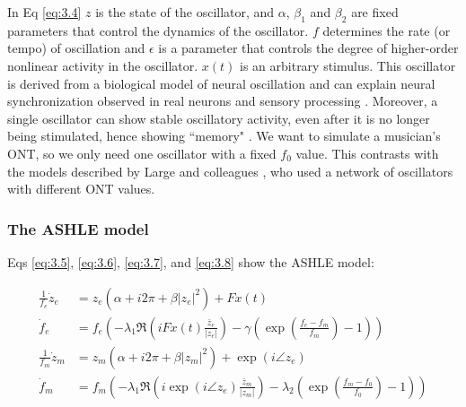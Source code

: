 \documentclass{report}
\begin{document}
In Eq \eqref{eq:3.4} $z$ is the state of the oscillator, and $\alpha$, $\beta_1$ and $\beta_2$ are fixed parameters that control the dynamics of the oscillator. $f$ determines the rate (or tempo) of oscillation and $\epsilon$ is a parameter that controls the degree of higher-order nonlinear activity in the oscillator. $x(t)$ is an arbitrary stimulus. This oscillator is derived from a biological model of neural oscillation and can explain neural synchronization observed in real neurons and sensory processing \cite{lerud2019canonical, tal2017neural}. Moreover, a single oscillator can show stable oscillatory activity, even after it is no longer being stimulated, hence showing ``memory" \cite{kim2015signal}. We want to simulate a musician's ONT, so we only need one oscillator with a fixed $f_0$ value. This contrasts with the models described by Large and colleagues \cite{large2010canonical}, who used a network of oscillators with different ONT values.

\subsubsection{The ASHLE model}

Eqs \eqref{eq:3.5}, \eqref{eq:3.6}, \eqref{eq:3.7}, and \eqref{eq:3.8} show the ASHLE model:

\begin{subequations}
\begin{align}
\frac{1}{f_e}\dot{z}_e &= z_e\left( \alpha + i2\pi + \beta|z_e|^2 \right) + Fx(t) \label{eq:3.5} \\
\dot{f}_e &= f_e \left(-\lambda_1\Re\left( iFx(t)\frac{\bar{z}_e}{|z_e|} \right) - \gamma\left( \exp\left(\frac{f_e-f_m}{f_m}\right)-1 \right) \right) \label{eq:3.6} \\
\frac{1}{f_m}\dot{z}_m &= z_m \left( \alpha + i2\pi + \beta|z_m|^2 \right) + \exp(i \angle z_e) \label{eq:3.7} \\
\dot{f}_m &= f_m \left( -\lambda_1\Re \left( i\exp(i \angle z_e)\frac{\bar{z}_m}{|z_m|} \right) - \lambda_2 \left( \exp\left(\frac{f_m-f_0}{f_0}\right)-1 \right) \right) \label{eq:3.8}
\end{align}
\end{subequations}
\end{document}
